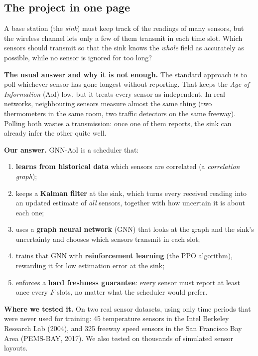 \subsection{The project in one page}

\begin{keybox}
A base station (the \emph{sink}) must keep track of the readings of many sensors, but the wireless channel lets
only a few of them transmit in each time slot. Which sensors should transmit so that the sink knows the
\emph{whole} field as accurately as possible, while no sensor is ignored for too long?
\end{keybox}

\textbf{The usual answer and why it is not enough.} The standard approach is to poll whichever sensor has gone
longest without reporting. That keeps the \emph{Age of Information} (AoI) low, but it treats every sensor as
independent. In real networks, neighbouring sensors measure almost the same thing (two thermometers in the same room,
two traffic detectors on the same freeway). Polling both wastes a transmission: once one of them reports, the sink
can already infer the other quite well.

\textbf{Our answer.} GNN-AoI is a scheduler that:
\begin{enumerate}
  \item \textbf{learns from historical data} which sensors are correlated (a \emph{correlation graph});
  \item keeps a \textbf{Kalman filter} at the sink, which turns every received reading into an updated estimate of
        \emph{all} sensors, together with how uncertain it is about each one;
  \item uses a \textbf{graph neural network} (GNN) that looks at the graph and the sink's uncertainty and chooses
        which sensors transmit in each slot;
  \item trains that GNN with \textbf{reinforcement learning} (the PPO algorithm), rewarding it for low estimation
        error at the sink;
  \item enforces a \textbf{hard freshness guarantee}: every sensor must report at least once every $F$ slots, no
        matter what the scheduler would prefer.
\end{enumerate}

\textbf{Where we tested it.} On two real sensor datasets, using only time periods that were never used for
training: 45 temperature sensors in the Intel Berkeley Research Lab (2004), and 325 freeway speed sensors in the
San Francisco Bay Area (PEMS-BAY, 2017). We also tested on thousands of simulated sensor layouts.

